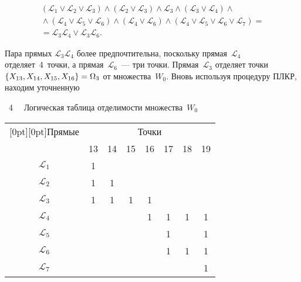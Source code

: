\begin{multicols}{2}
\vspace*{-2pt}

\noindent
\begin{multline*}
(\mathcal{ L}_1 \vee \mathcal{ L}_2 \vee \mathcal{ L}_3)
\wedge (\mathcal{ L}_2 \vee \mathcal{ L}_3)\wedge \mathcal{ L}_3 
\wedge (\mathcal{ L}_3 \vee \mathcal{ L}_4)\wedge {}\\
{}\wedge (\mathcal{ L}_4 \vee \mathcal{ L}_5 \vee \mathcal{ L}_6)\wedge 
 (\mathcal{ L}_4 \vee \mathcal{ L}_6)\wedge (\mathcal{ L}_4 
 \vee \mathcal{ L}_5\vee \mathcal{ L}_6\vee \mathcal{ L}_7)={}\\
{} =\mathcal{ L}_3\mathcal{ L}_4 \vee \mathcal{ L}_3\mathcal{ L}_6.
\end{multline*}

\vspace*{-2pt}

Пара прямых $\mathcal{ L}_3\mathcal{ L}_4$ более предпочтительна, 
поскольку прямая~$\mathcal{ L}_4$ отделяет~4~точки, а прямая~$\mathcal{ L}_6$~--- 
три точки. Прямая~$\mathcal{ L}_3$ отделяет точки $\{X_{13}, X_{14}, 
X_{15}, X_{16}\} \hm=\Omega_3$ от множества~$W_0$. 
Вновь используя процедуру ПЛКР, находим уточненную\linebreak\vspace*{-12pt}

\pagebreak


{ \begin{center}  %
 
\noindent
\parbox{70mm}{{{\tablename~4}\ \ \small{
Логическая таблица отделимости множества~$W_0$
}}}
\end{center}}

{\small %
\begin{center}
\vspace*{-3pt}
     \begin{tabular}{|c|c|c|c|c|c|c|c|}
\hline
\multicolumn{1}{|c|}{\raisebox{-6pt}[0pt][0pt]{Прямые}}
 & \multicolumn{7}{c|}{Точки} \\
                                \cline{2-8}
                        & 13  &  14 & 15  & 16  &  17 & 18  &  19 \\
\hline
$\mathcal{L}_1$ & 1  &   &   &   &  &  &  \\
$\mathcal{L}_2$ & 1  & 1  &   &   &  &  &  \\
$\mathcal{L}_3$ & 1  &  1 & 1   & 1  &  & &  \\
$\mathcal{L}_4$ &   &   &   & 1  & 1 & 1 & 1 \\
$\mathcal{L}_5$ &    &   &   &   & 1 &  & 1 \\
$\mathcal{L}_6$ &    &   &   &   & 1 & 1 & 1 \\
$\mathcal{L}_7$ &    &   &   &   &  &  & 1 \\
\hline
\end{tabular}
\end{center}
}


\end{multicols}
